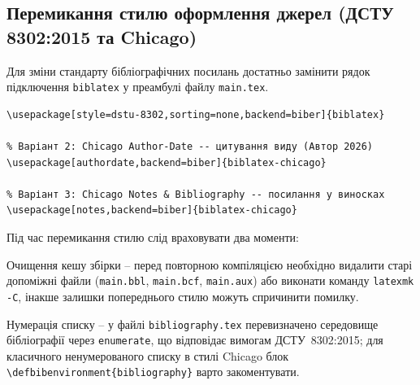 \subsection{Перемикання стилю оформлення джерел (ДСТУ 8302:2015 та Chicago)}
\label{subsec:bib-styles}

Для зміни стандарту бібліографічних посилань достатньо замінити рядок підключення \texttt{biblatex} у преамбулі файлу \texttt{main.tex}.

\begin{lstlisting}[label={lst:bib-styles}]
% Варіант 1: ДСТУ 8302:2015 (використовує dstu-8302.bbx та dstu-8302.cbx)
\usepackage[style=dstu-8302,sorting=none,backend=biber]{biblatex}

% Варіант 2: Chicago Author-Date -- цитування виду (Автор 2026)
\usepackage[authordate,backend=biber]{biblatex-chicago}

% Варіант 3: Chicago Notes & Bibliography -- посилання у виносках
\usepackage[notes,backend=biber]{biblatex-chicago}
\end{lstlisting}

Під час перемикання стилю слід враховувати два моменти:
\begin{dashlist}[wide,beginpenalty=10000]
    \item Очищення кешу збірки -- перед повторною компіляцією необхідно видалити старі допоміжні файли (\texttt{main.bbl}, \texttt{main.bcf}, \texttt{main.aux}) або виконати команду \texttt{latexmk -C}, інакше залишки попереднього стилю можуть спричинити помилку.
    \item Нумерація списку -- у файлі \texttt{bibliography.tex} перевизначено середовище бібліографії через \texttt{enumerate}, що відповідає вимогам ДСТУ~8302:2015; для класичного ненумерованого списку в стилі Chicago блок \texttt{\textbackslash defbibenvironment\{bibliography\}} варто закоментувати.
\end{dashlist}
